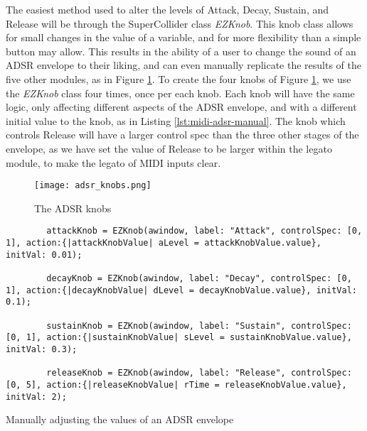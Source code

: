 The easiest method used to alter the levels of Attack, Decay, Sustain, and Release will be through the SuperCollider class \textit{EZKnob}. This knob class allows for small changes in the value of a variable, and for more flexibility than a simple button may allow. This results in the ability of a user to change the sound of an ADSR envelope to their liking, and can even manually replicate the results of the five other modules, as in Figure \ref{fig:adsr-knobs}. To create the four knobs of Figure \ref{fig:adsr-knobs}, we use the \textit{EZKnob} class four times, once per each knob. Each knob will have the same logic, only affecting different aspects of the ADSR envelope, and with a different initial value to the knob, as in Listing \ref{lst:midi-adsr-manual}. The knob which controls Release will have a larger control spec than the three other stages of the envelope, as we have set the value of Release to be larger within the legato module, to make the legato of MIDI inputs clear.

\begin{figure}[h]
  \centering
  \texttt{[image: adsr\_knobs.png]}
  \caption{The ADSR knobs}
  \label{fig:adsr-knobs}
\end{figure}


\begin{listing}
	\begin{lstlisting}
		attackKnob = EZKnob(awindow, label: "Attack", controlSpec: [0, 1], action:{|attackKnobValue| aLevel = attackKnobValue.value}, initVal: 0.01);

		decayKnob = EZKnob(awindow, label: "Decay", controlSpec: [0, 1], action:{|decayKnobValue| dLevel = decayKnobValue.value}, initVal: 0.1);

		sustainKnob = EZKnob(awindow, label: "Sustain", controlSpec: [0, 1], action:{|sustainKnobValue| sLevel = sustainKnobValue.value}, initVal: 0.3);

		releaseKnob = EZKnob(awindow, label: "Release", controlSpec: [0, 5], action:{|releaseKnobValue| rTime = releaseKnobValue.value}, initVal: 2);
	\end{lstlisting}	
	\caption{Manually adjusting the values of an ADSR envelope}
	\label{lst:midi-adsr-manual}
\end{listing}

